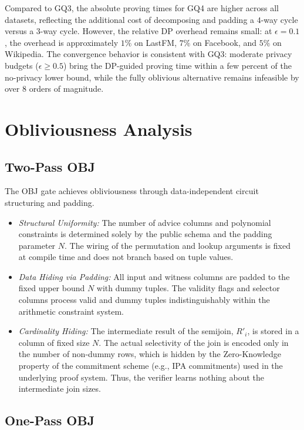 \documentclass[sigconf]{acmart}
\renewcommand{\emph}[1]{\textit{#1}}
\begin{document}
Compared to GQ3, the absolute proving times for GQ4 are higher across all datasets, reflecting the additional cost of decomposing and padding a $4$-way cycle versus a $3$-way cycle. However, the relative DP overhead remains small: at $\epsilon = 0.1$, the overhead is approximately $1\%$ on LastFM, $7\%$ on Facebook, and $5\%$ on Wikipedia. The convergence behavior is consistent with GQ3: moderate privacy budgets ($\epsilon \ge 0.5$) bring the DP-guided proving time within a few percent of the no-privacy lower bound, while the fully oblivious alternative remains infeasible by over $8$ orders of magnitude.




\section{Obliviousness Analysis}
\label{app:obliviousness}

\subsection{Two-Pass OBJ}

The OBJ gate achieves obliviousness through data-independent circuit structuring and padding.
\begin{itemize}[leftmargin=*]
    \item \emph{Structural Uniformity:} The number of advice columns and polynomial constraints is determined solely by the public schema and the padding parameter $N$. The wiring of the permutation and lookup arguments is fixed at compile time and does not branch based on tuple values.
    \item \emph{Data Hiding via Padding:} All input and witness columns are padded to the fixed upper bound $N$ with dummy tuples. The validity flags and selector columns process valid and dummy tuples indistinguishably within the arithmetic constraint system.
    \item \emph{Cardinality Hiding:} The intermediate result of the semijoin, $R'_i$, is stored in a column of fixed size $N$. The actual selectivity of the join is encoded only in the number of non-dummy rows, which is hidden by the Zero-Knowledge property of the commitment scheme (e.g., IPA commitments) used in the underlying proof system. Thus, the verifier learns nothing about the intermediate join sizes.
\end{itemize}

\subsection{One-Pass OBJ}
\end{document}
